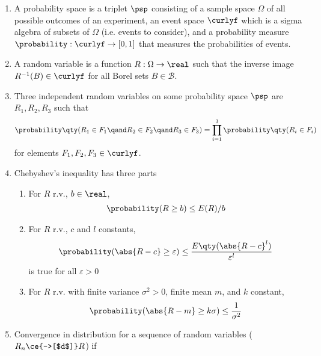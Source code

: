 \begin{solution}
    \begin{enumerate}
        \item A probability space is a triplet $\psp$ consisting of a sample space $\Omega$ of all possible outcomes of an experiment, an event space $\curlyf$ which is a sigma algebra of subsets of $\Omega$ (i.e. events to consider), and a probability measure $\probability: \curlyf \to [0,1]$ that measures the probabilities of events.
        \item A random variable is a function $R: \Omega \to \real$ such that the inverse image $R^{-1}(B) \in \curlyf$ for all Borel sets $B \in \mathcal{B}$.
        \item Three independent random variables on some probability space $\psp$ are $R_1,R_2,R_3$ such that
            \begin{align}
                \probability\qty(R_1 \in F_1 \qand R_2 \in F_2 \qand R_3 \in F_3) = \prod_{i=1}^3 \probability\qty(R_i \in F_i)
            \end{align}
            for elements $F_1,F_2,F_3 \in \curlyf$.
        \item Chebyshev's inequality has three parts
            \begin{enumerate}
                \item For $R$ r.v., $b \in \real$,
                    \begin{align}
                        \probability(R \ge b) \le E(R)/b
                    \end{align}
                \item For $R$ r.v., $c$ and $l$ constants,
                    \begin{align}
                        \probability(\abs{R - c} \ge \varepsilon) \le \frac{E\qty(\abs{R-c}^l)}{\varepsilon^l}
                    \end{align}
                    is true for all $\varepsilon > 0$
                \item For $R$ r.v. with finite variance $\sigma^2 > 0$, finite mean $m$, and $k$ constant,
                    \begin{align}
                        \probability(\abs{R-m} \ge k\sigma) \le \frac{1}{\sigma^2}
                    \end{align}
            \end{enumerate}
        \item Convergence in distribution for a sequence of random variables ($R_n \ce{->[$d$]} R$) if

\end{enumerate}
\end{solution}
